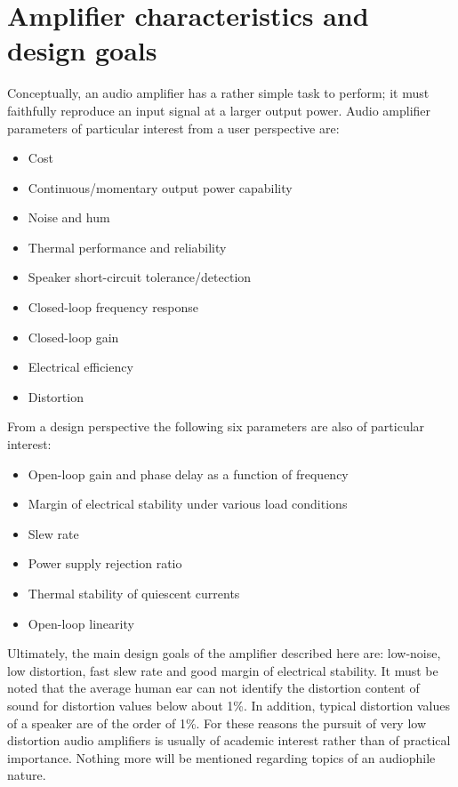\documentclass[a4paper,10pt, oneside]{article}
\begin{document}
\section{Amplifier characteristics and design goals}
Conceptually, an audio amplifier has a rather simple task to perform; it must faithfully reproduce an input signal  at a larger output power. 
Audio amplifier parameters of particular interest from a user perspective are:
\begin{itemize}
 \item Cost
 \item Continuous/momentary output power capability
 \item Noise and hum 
 \item Thermal performance and reliability
 \item Speaker short-circuit tolerance/detection
 \item Closed-loop frequency response
 \item Closed-loop gain
 \item Electrical efficiency
 \item Distortion
\end{itemize}
From a design perspective the following six parameters are also of particular interest:
\begin{itemize}
	\item Open-loop gain and phase delay as a function of frequency
	\item Margin of electrical stability under various load conditions
	\item Slew rate
	\item Power supply rejection ratio
	\item Thermal stability of quiescent currents
	\item Open-loop linearity
\end{itemize}
Ultimately, the main design goals of the amplifier described here are: low-noise, low distortion, fast slew rate and good margin of electrical stability. It must be noted that the average human ear can not identify the distortion content of sound for distortion values 
below about 1\%. In addition, typical distortion values of a speaker are of the order of 1\%. For these reasons the 
pursuit of very low distortion audio amplifiers is usually of academic interest rather than of practical importance. Nothing 
more will be mentioned regarding topics of an audiophile nature. 
\end{document}
